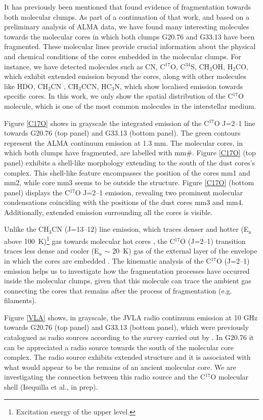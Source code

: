 \documentclass[baaa]{baaa}
\begin{document}
It has previously been mentioned that \citet{Marinelli22} found evidence of fragmentation towards both molecular clumps. As part of a continuation of that work, and based on a preliminary analysis of ALMA data, we have found many interesting molecules towards the molecular cores in which both clumps G20.76 and G33.13 have been fragmented. These molecular lines provide crucial information about the physical and chemical conditions of the cores embedded in the molecular clumps. For instance, we have detected molecules such as CN, C$^{17}$O, C$^{34}$S, CH$_{3}$OH, H$_{2}$CO, which exhibit extended emission beyond the cores, along with other molecules like HDO, CH$_{3}$CN \citep[analysed in][]{Marinelli22}, CH$_{3}$CCN, HC$_{3}$N, which show localised emission towards specific cores. In this work, we only show the spatial distribution of the C$^{17}$O molecule, which is one of the most common molecules in the interstellar medium.


Figure \ref{C17O} shows in grayscale the integrated emission of the C$^{17}$O J=2--1 line towards G20.76 (top panel) and G33.13 (bottom panel). The green contours represent the ALMA continuum emission at 1.3 mm. The molecular cores, in which both clumps have fragmented, are labelled with mm\#. Figure \ref{C17O} (top panel) exhibits a shell-like morphology extending to the south of the dust cores's complex. This shell-like feature encompasses the position of the cores mm1 and mm2, while core mm3 seems to be outside the structure. Figure \ref{C17O} (bottom panel) displays the C$^{17}$O J=2--1 emission, revealing two prominent molecular condensations coinciding with the positions of the dust cores mm3 and mm4. Additionally, extended emission surrounding all the cores is visible. 

Unlike the CH$_{3}$CN (J=13--12) line emission,  which traces denser and hotter (E$_u$ above 100~K)\footnote{Excitation energy of the upper level.}
gas towards molecular hot cores \citep[see][]{Marinelli22}, the C$^{17}$O (J=2--1) transition traces less dense and cooler (E$_u$ $\sim$ 20~K) gas of the external layer of the envelope in which the cores are embedded \citep{Fontani2005}. The kinematic analysis of the C$^{17}$O (J=2--1) emission helps us to investigate how the fragmentation processes have occurred inside the molecular clumps, given that this molecule can trace the ambient gas connecting the cores that remains after the process of fragmentation (e.g. filaments).


Figure \ref{VLA} shows, in grayscale, the JVLA radio continuum emission at 10 GHz towards G20.76 (top panel) and G33.13 (bottom panel), which were previously catalogued as radio sources according to the survey carried out by \cite{Purcell2013}. In G20.76 it can be appreciated a radio source towards the south of the molecular core complex. The radio source exhibits extended structure and it is associated with what would appear to be the remains of an ancient molecular core. We are investigating the connection between this radio source and the C$^{17}$O molecular shell (Isequilla et al., in prep).
\end{document}
